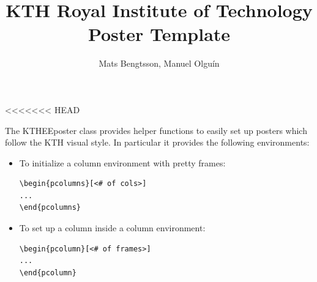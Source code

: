 \documentclass[portrait, a0]{KTHEEposter}
\begin{document}
    
<<<<<<< HEAD
    \title{KTH Royal Institute of Technology\\Poster Template}
    
    \author{Mats Bengtsson, Manuel Olguín}
    \maketitle

    \begin{pcolumns}[3] %
        \begin{pcolumn}[4] %
            \begin{pframe}[1.15] %
                The KTHEEposter class provides helper functions to easily set up posters which follow the KTH visual style.
                In particular it provides the following environments:
                \begin{itemize}
                    \item To initialize a column environment with pretty frames:
                    \begin{lstlisting}
\begin{pcolumns}[<# of cols>]
... 
\end{pcolumns}
                    \end{lstlisting}
                    
                    \item To set up a column inside a column environment:
                    \begin{lstlisting}
\begin{pcolumn}[<# of frames>]
...
\end{pcolumn}
                    \end{lstlisting}
                

\end{itemize}
\end{pframe}
\end{pcolumn}
\end{pcolumns}
\end{document}
